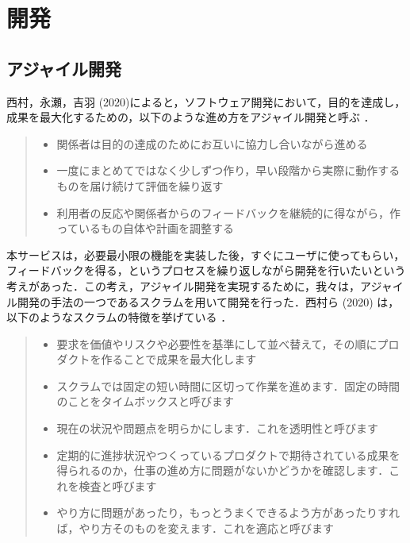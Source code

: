 \section{開発}
\subsection{アジャイル開発}
西村，永瀬，吉羽 (2020)によると，ソフトウェア開発において，目的を達成し，成果を最大化するための，以下のような進め方をアジャイル開発と呼ぶ \cite{scrum}．
\begin{quote}
    \begin{itemize}
        \item 関係者は目的の達成のためにお互いに協力し合いながら進める
        \item 一度にまとめてではなく少しずつ作り，早い段階から実際に動作するものを届け続けて評価を繰り返す
        \item 利用者の反応や関係者からのフィードバックを継続的に得ながら，作っているもの自体や計画を調整する
    \end{itemize}
\end{quote}

本サービスは，必要最小限の機能を実装した後，すぐにユーザに使ってもらい，フィードバックを得る，というプロセスを繰り返しながら開発を行いたいという考えがあった．この考え，アジャイル開発を実現するために，我々は，アジャイル開発の手法の一つであるスクラムを用いて開発を行った．西村ら (2020) は，以下のようなスクラムの特徴を挙げている \cite{scrum}．

\begin{quote}
    \begin{itemize}
        \item 要求を価値やリスクや必要性を基準にして並べ替えて，その順にプロダクトを作ることで成果を最大化します
        \item スクラムでは固定の短い時間に区切って作業を進めます．固定の時間のことをタイムボックスと呼びます
        \item 現在の状況や問題点を明らかにします．これを透明性と呼びます
        \item 定期的に進捗状況やつくっているプロダクトで期待されている成果を得られるのか，仕事の進め方に問題がないかどうかを確認します．これを検査と呼びます
        \item やり方に問題があったり，もっとうまくできるよう方があったりすれば，やり方そのものを変えます．これを適応と呼びます
    \end{itemize}
\end{quote}

